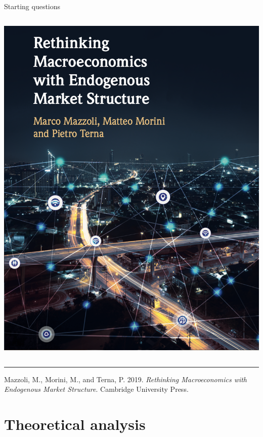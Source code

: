 \documentclass[9pt]{beamer}
\begin{document}
\begin{frame}{Starting questions}
\begin{columns}[T]
 \begin{column}{.4\textwidth}
 \begin{block}{}
 \includegraphics[scale=0.25]{cover.png}
  \end{block}
  \end{column}
    
\end{columns}


\smallskip

\noindent\rule{8cm}{0.4pt}
\scriptsize

Mazzoli, M., Morini, M., and Terna, P. 2019. \emph{Rethinking Macroeconomics with Endogenous Market Structure}. Cambridge University Press.

\end{frame}


\section{Theoretical analysis}
\end{document}
